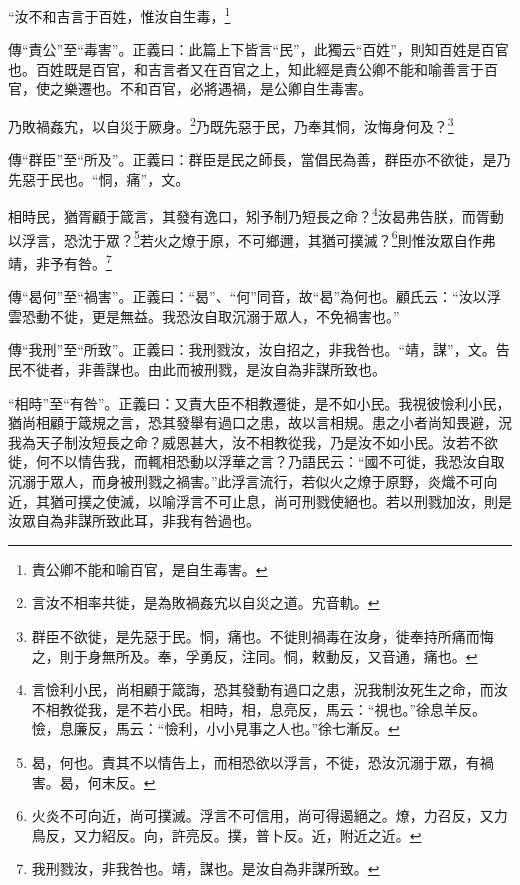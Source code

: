 “汝不和吉言于百姓，惟汝自生毒，\footnote{責公卿不能和喻百官，是自生毒害。}

{\noindent\zhuan{}\fzbyks 傳“責公”至“毒害”。正義曰：此篇上下皆言“民”，此獨云“百姓”，則知百姓是百官也。百姓既是百官，和吉言者又在百官之上，知此經是責公卿不能和喻善言于百官，使之樂遷也。不和百官，必將遇禍，是公卿自生毒害。 \par}

乃敗禍姦宄，以自災于厥身。\footnote{言汝不相率共徙，是為敗禍姦宄以自災之道。宄音軌。}乃既先惡于民，乃奉其恫，汝悔身何及？\footnote{群臣不欲徙，是先惡于民。恫，痛也。不徙則禍毒在汝身，徙奉持所痛而悔之，則于身無所及。奉，孚勇反，注同。恫，敕動反，又音通，痛也。}

{\noindent\zhuan{}\fzbyks 傳“群臣”至“所及”。正義曰：群臣是民之師長，當倡民為善，群臣亦不欲徙，是乃先惡于民也。“恫，痛”，文。 \par}

相時民，猶胥顧于箴言，其發有逸口，矧予制乃短長之命？\footnote{言憸利小民，尚相顧于箴誨，恐其發動有過口之患，況我制汝死生之命，而汝不相教從我，是不若小民。相時，相，息亮反，馬云：“視也。”徐息羊反。憸，息廉反，馬云：“憸利，小小見事之人也。”徐七漸反。}汝曷弗告朕，而胥動以浮言，恐沈于眾？\footnote{曷，何也。責其不以情告上，而相恐欲以浮言，不徙，恐汝沉溺于眾，有禍害。曷，何末反。}若火之燎于原，不可鄉邇，其猶可撲滅？\footnote{火炎不可向近，尚可撲滅。浮言不可信用，尚可得遏絕之。燎，力召反，又力鳥反，又力紹反。向，許亮反。撲，普卜反。近，附近之近。}則惟汝眾自作弗靖，非予有咎。\footnote{我刑戮汝，非我咎也。靖，謀也。是汝自為非謀所致。}

{\noindent\zhuan{}\fzbyks 傳“曷何”至“禍害”。正義曰：“曷”、“何”同音，故“曷”為何也。顧氏云：“汝以浮雲恐動不徙，更是無益。我恐汝自取沉溺于眾人，不免禍害也。” \par}

{\noindent\zhuan{}\fzbyks 傳“我刑”至“所致”。正義曰：我刑戮汝，汝自招之，非我咎也。“靖，謀”，文。告民不徙者，非善謀也。由此而被刑戮，是汝自為非謀所致也。 \par}

{\noindent\shu{}\fzkt “相時”至“有咎”。正義曰：又責大臣不相教遷徙，是不如小民。我視彼憸利小民，猶尚相顧于箴規之言，恐其發舉有過口之患，故以言相規。患之小者尚知畏避，況我為天子制汝短長之命？威恩甚大，汝不相教從我，乃是汝不如小民。汝若不欲徙，何不以情告我，而輒相恐動以浮華之言？乃語民云：“國不可徙，我恐汝自取沉溺于眾人，而身被刑戮之禍害。”此浮言流行，若似火之燎于原野，炎熾不可向近，其猶可撲之使滅，以喻浮言不可止息，尚可刑戮使絕也。若以刑戮加汝，則是汝眾自為非謀所致此耳，非我有咎過也。 \par}

